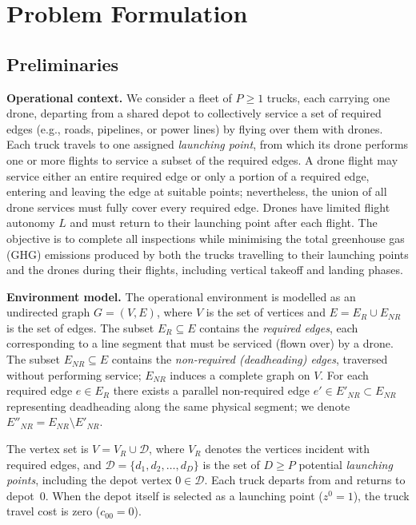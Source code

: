 \documentclass[a4paper,fleqn]{cas-dc}
\begin{document}
\section{Problem Formulation}\label{sec:problem}

\subsection{Preliminaries}

\textbf{Operational context.}
We consider a fleet of $P \geq 1$ trucks, each carrying one drone, departing from a shared depot to collectively service a set of required edges (e.g., roads, pipelines, or power lines) by flying over them with drones. Each truck travels to one assigned \emph{launching point}, from which its drone performs one or more flights to service a subset of the required edges. A drone flight may service either an entire required edge or only a portion of a required edge, entering and leaving the edge at suitable points; nevertheless, the union of all drone services must fully cover every required edge. Drones have limited flight autonomy $L$ and must return to their launching point after each flight. The objective is to complete all inspections while minimising the total greenhouse gas (GHG) emissions produced by both the trucks travelling to their launching points and the drones during their flights, including vertical takeoff and landing phases.

\textbf{Environment model.}
The operational environment is modelled as an undirected graph $G = (V, E)$, where $V$ is the set of vertices and $E = E_R \cup E_{NR}$ is the set of edges. The subset $E_R \subseteq E$ contains the \emph{required edges}, each corresponding to a line segment that must be serviced (flown over) by a drone. The subset $E_{NR} \subseteq E$ contains the \emph{non-required (deadheading) edges}, traversed without performing service; $E_{NR}$ induces a complete graph on $V$. For each required edge $e \in E_R$ there exists a parallel non-required edge $e' \in E'_{NR} \subset E_{NR}$ representing deadheading along the same physical segment; we denote $E''_{NR} = E_{NR} \setminus E'_{NR}$.

The vertex set is $V = V_R \cup \mathcal{D}$, where $V_R$ denotes the vertices incident with required edges, and $\mathcal{D} = \{d_1, d_2, \ldots, d_D\}$ is the set of $D \geq P$ potential \emph{launching points}, including the depot vertex $0 \in \mathcal{D}$. Each truck departs from and returns to depot~$0$. When the depot itself is selected as a launching point ($z^0 = 1$), the truck travel cost is zero ($c_{00} = 0$).
\end{document}
